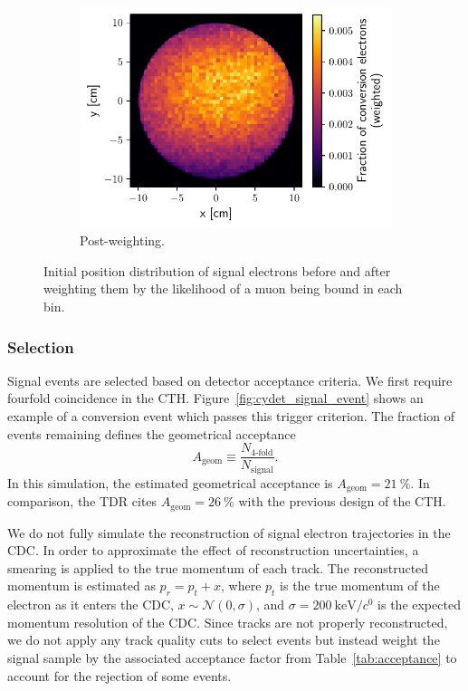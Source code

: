 \begin{figure}
\begin{subfigure}[t]{0.329\textwidth}
        \includegraphics[width=\textwidth]{chapter6/weighted_conversion_position_distribution.pdf}
        \caption{Post-weighting.}
    \end{subfigure}
    \caption{ Initial position distribution of signal electrons before and after
        weighting them by the likelihood of a muon being bound in each bin. }
    \label{fig:stopping_position_reweighting}
\end{figure}


\subsubsection{Selection}
Signal events are selected based on detector acceptance criteria. We first
require fourfold coincidence in the CTH. Figure~\ref{fig:cydet_signal_event}
shows an example of a conversion event which passes this trigger criterion. The
fraction of events remaining defines the geometrical acceptance 
\begin{equation}
A_\mathrm{geom} \equiv  \frac{N_\text{4-fold}}{N_\mathrm{signal}}.
\end{equation}
In this simulation, the estimated geometrical acceptance is $A_\mathrm{geom} =
\SI{21}{\percent}$. In comparison, the TDR cites $A_\mathrm{geom} =
\SI{26}{\percent}$ with the previous design of the CTH.


We do not fully simulate the reconstruction of signal electron trajectories in
the CDC. In order to approximate the effect of reconstruction uncertainties, a
smearing is applied to the true momentum of each track. The reconstructed
momentum is estimated as $p_r = p_t + x$, where $p_t$ is the true momentum of
the electron as it enters the CDC, $x \sim \mathcal{N}(0, \sigma)$, and $\sigma
= \SI{200}{\keV/\clight}$ is the expected momentum resolution of the CDC. Since
tracks are not properly reconstructed, we do not apply any track quality cuts to
select events but instead weight the signal sample by the associated acceptance
factor from Table~\ref{tab:acceptance} to account for the rejection of some
events.

